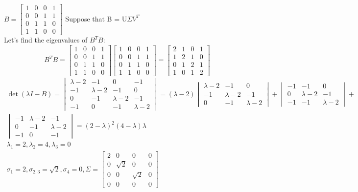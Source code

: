 \documentclass{article}
\begin{document}
	$B=
	\begin{bmatrix}
	1 & 0 & 0 & 1\\
	0 & 0 & 1 & 1\\
	0 & 1 & 1 & 0\\
	1 & 1 & 0 & 0
	\end{bmatrix}$
	Suppose that B = U$\Sigma V^{T}$ \\
	Let's find the eigenvalues of $B^{T}B$:
	\[
	B^{T}B =
	\begin{bmatrix}
	1 & 0 & 0 & 1\\
	0 & 0 & 1 & 1\\
	0 & 1 & 1 & 0\\
	1 & 1 & 0 & 0
	\end{bmatrix}
	\begin{bmatrix}
	1 & 0 & 0 & 1\\
	0 & 0 & 1 & 1\\
	0 & 1 & 1 & 0\\
	1 & 1 & 0 & 0
	\end{bmatrix}
	=
	\begin{bmatrix}
	2 & 1 & 0 & 1\\
	1 & 2 & 1 & 0\\
	0 & 1 & 2 & 1\\
	1 & 0 & 1 & 2
	\end{bmatrix}
	\]	
	\begin{gather*}
	\det(\lambda I - B)=\begin{vmatrix}	
	\lambda-2 & -1 & 0 & -1\\
	-1 & \lambda-2 & -1 & 0\\
	0 & -1 & \lambda-2 & -1\\
	-1 & 0 & -1 & \lambda-2
	\end{vmatrix}=
	(\lambda-2)
	\begin{vmatrix}
	\lambda-2 & -1 & 0 \\
	-1 & \lambda-2 & -1 \\
	0 & -1 & \lambda-2
	\end{vmatrix}		
	+
	\begin{vmatrix}	
	-1 & -1 & 0 \\
	0 & \lambda-2 & -1 \\
	-1 & -1 & \lambda-2
	\end{vmatrix}
	+\\
	\begin{vmatrix}
	-1 & \lambda-2 & -1 \\
	0 & -1 & \lambda-2 \\
	-1 & 0 & -1
	\end{vmatrix}=
	(2-\lambda)^2(4-\lambda)\lambda\\
	\lambda_{1}=2,\lambda_{2}=4, 	\lambda_{3}=0\\
	\sigma_{1}=2, \sigma_{2,3}=\sqrt{2},\sigma_{4}=0, 
	\Sigma=\begin{bmatrix}
	2 & 0 & 0 & 0\\
	0 & \sqrt{2} & 0 & 0\\
	0 & 0 & \sqrt{2} & 0\\
	0 & 0 & 0 & 0
	\end{bmatrix}
	\end{gather*}
\end{document}
